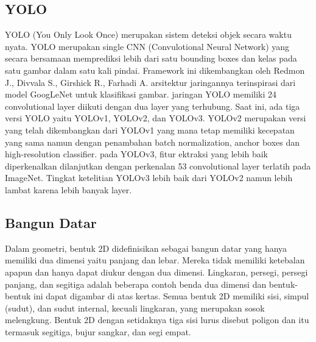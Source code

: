
\subsection{YOLO}
\label{subsec:YOLO}
YOLO (You Only Look Once) merupakan sistem deteksi objek secara waktu nyata. YOLO merupakan single CNN (Convulotional Neural Network) yang secara bersamaan memprediksi lebih dari satu bounding boxes dan kelas pada satu gambar dalam satu kali pindai. Framework ini dikembangkan oleh Redmon J., Divvala S., Girshick R., Farhadi A. arsitektur jaringannya terinspirasi dari model GoogLeNet untuk klasifikasi gambar. jaringan YOLO memiliki 24 convolutional layer diikuti dengan dua layer yang terhubung.
Saat ini, ada tiga versi YOLO yaitu YOLOv1, YOLOv2, dan YOLOv3. YOLOv2 merupakan versi yang telah dikembangkan dari YOLOv1 yang mana tetap memiliki kecepatan yang sama namun dengan penambahan batch normalization, anchor boxes dan high-resolution classifier. pada YOLOv3, fitur ektraksi yang lebih baik diperkenalkan dilanjutkan dengan perkenalan 53 convolutional layer terlatih pada ImageNet. Tingkat ketelitian YOLOv3 lebih baik dari YOLOv2 namun lebih lambat karena lebih banyak layer.\citep{Redmon_2016_CVPR}

\subsection{Bangun Datar}
\label{subsec:BangunDatar}
Dalam geometri, bentuk 2D didefinisikan sebagai bangun datar yang hanya memiliki dua dimensi yaitu panjang dan lebar. Mereka tidak memiliki ketebalan apapun dan hanya dapat diukur dengan dua dimensi. Lingkaran, persegi, persegi panjang, dan segitiga adalah beberapa contoh benda dua dimensi dan bentuk-bentuk ini dapat digambar di atas kertas. Semua bentuk 2D memiliki sisi, simpul (sudut), dan sudut internal, kecuali lingkaran, yang merupakan sosok melengkung. Bentuk 2D dengan setidaknya tiga sisi lurus disebut poligon dan itu termasuk segitiga, bujur sangkar, dan segi empat.\citep{BRIBIESCA1992483}


